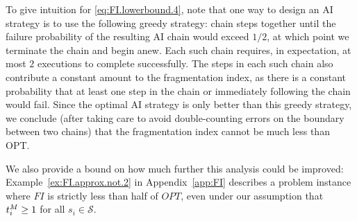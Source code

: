 To give intuition for \eqref{eq:FI.lowerbound.4}, note that one way to design an AI strategy is to use the following greedy strategy: chain steps together until the failure probability of the resulting AI chain would exceed $1/2$, at which point we terminate the chain and begin anew. Each such chain requires, in expectation, at most $2$ executions to complete successfully. The steps in each such chain also contribute a constant amount to the fragmentation index, as there is a constant probability that at least one step in the chain or immediately following the chain would fail. Since the optimal AI strategy is only better than this greedy strategy, we conclude (after taking care to avoid double-counting errors on the boundary between two chains) that the fragmentation index cannot be much less than OPT.

We also provide a bound on how much further this analysis could be improved: Example~\ref{ex:FI.approx.not.2} in Appendix~\ref{app:FI} describes a problem instance where $FI$ is strictly less than half of $OPT$, even under our assumption that $t^{M}_{i} \geq 1$ for all $s_i \in \mathcal{S}$.




